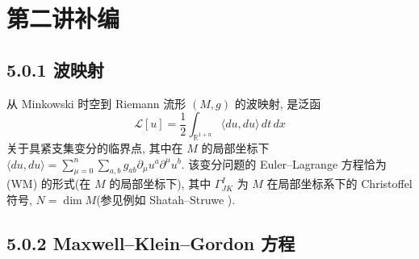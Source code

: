 \chapter{第二讲补编}

\section*{5.0.1 波映射}

从 Minkowski 时空到 Riemann 流形 $(M,g)$ 的波映射, 是泛函
\begin{equation}
\mathcal{L}[u]=\frac12\int_{\mathbb{R}^{1+n}}\langle du,du\rangle\,dt\,dx
\end{equation}
关于具紧支集变分的临界点, 其中在 $M$ 的局部坐标下 $\langle du,du\rangle=\sum_{\mu=0}^n\sum_{a,b}g_{ab}\partial_\mu u^a\partial^\mu u^b$. 该变分问题的 Euler--Lagrange 方程恰为 (WM) 的形式(在 $M$ 的局部坐标下), 其中 $\Gamma_{JK}^I$ 为 $M$ 在局部坐标系下的 Christoffel 符号, $N=\dim M$(参见例如 Shatah--Struwe \cite{klai58}).
\section*{5.0.2 Maxwell--Klein--Gordon 方程}


